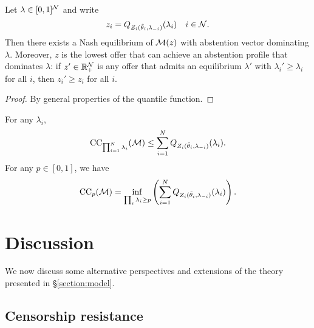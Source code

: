 \begin{corollary}
  \label{thm:equilibrium-from-quantile}

  Let $\lambda\in[0,1]^{\mathcal{N}}$ and write
  \[
    z_i = Q_{Z_i(\tilde\theta_i,\lambda_{-i})}(\lambda_i) \quad i\in\mathcal{N}.
  \]
  Then there exists a Nash equilibrium of $\mathcal{M}(z)$ with abstention vector dominating $\lambda$.
  Moreover, $z$ is the lowest offer that can achieve an abstention profile that dominates $\lambda$: if $z'\in\mathbb{R}_+^{\mathcal{N}}$ is any offer that admits an equilibrium $\lambda'$ with $\lambda_i'\geq\lambda_i$ for all $i$, then $z_i'\geq z_i$ for all $i$.

\end{corollary}
%
\begin{proof}

  By general properties of the quantile function. \qedhere

\end{proof}

\begin{corollary}

  For any $\lambda_i$,
  \[
    \mathrm{CC}_{\prod_{i=1}^N\lambda_i}(\mathcal{M}) \leq \sum_{i=1}^N Q_{Z_i(\tilde\theta_i,\lambda_{-i})}(\lambda_i) .
  \]
  For any $p\in[0,1]$, we have
  \[
    \mathrm{CC}_{p}(\mathcal{M}) = \inf_{\prod_i\lambda_i \geq p} \left(\sum_{i=1}^N Q_{Z_i(\tilde\theta_i,\lambda_{-i})}(\lambda_i) \right).
  \]
  

\end{corollary}


















\section{Discussion}

We now discuss some alternative perspectives and extensions of the theory presented in \S\ref{section:model}.

\subsection{Censorship resistance}
\label{section:cr}

